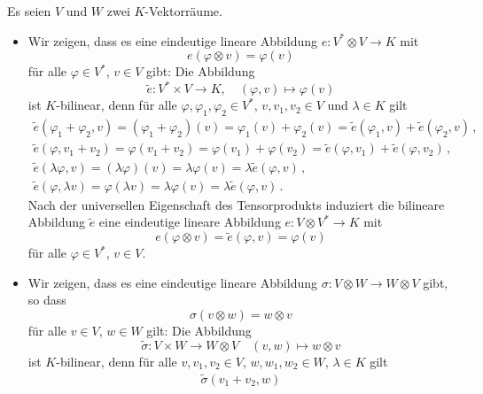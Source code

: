 \begin{example}
  Es seien $V$ und $W$ zwei $K$-Vektorräume.
  \begin{itemize}
    \item
      Wir zeigen, dass es eine eindeutige lineare Abbildung $e \colon V^* \otimes V \to K$ mit
      \[
          e(\varphi \otimes v)
        = \varphi(v)
      \]
      für alle $\varphi \in V^*$, $v \in V$ gibt:
      Die Abbildung
      \[
                \tilde{e}
        \colon  V^* \times V
        \to     K,
        \quad   (\varphi, v)
        \mapsto \varphi(v)
      \]
      ist $K$-bilinear, denn für alle $\varphi, \varphi_1, \varphi_2 \in V^*$, $v, v_1, v_2 \in V$ und $\lambda \in K$ gilt
      \begin{gather*}
                \tilde{e}(\varphi_1 + \varphi_2, v)
        = (\varphi_1 + \varphi_2)(v)
        = \varphi_1(v) + \varphi_2(v)
        = \tilde{e}(\varphi_1, v) + \tilde{e}(\varphi_2, v) \,,
        \\
          \tilde{e}(\varphi, v_1 + v_2)
        = \varphi(v_1 + v_2)
        = \varphi(v_1) + \varphi(v_2)
        = \tilde{e}(\varphi, v_1) + \tilde{e}(\varphi, v_2) \,,
        \\
          \tilde{e}(\lambda \varphi, v)
        = (\lambda \varphi)(v)
        = \lambda \varphi(v)
        = \lambda \tilde{e}(\varphi, v) \,,
        \\
          \tilde{e}(\varphi, \lambda v)
        = \varphi(\lambda v)
        = \lambda \varphi(v)
        = \lambda \tilde{e}(\varphi, v) \,.
      \end{gather*}
      Nach der universellen Eigenschaft des Tensorprodukts induziert die bilineare Abbildung $\tilde{e}$ eine eindeutige lineare Abbildung $e \colon V \otimes V^* \to K$ mit
      \[
          e(\varphi \otimes v)
        = \tilde{e}(\varphi, v)
        = \varphi(v)
      \]
      für alle $\varphi \in V^*$, $v \in V$.
    \item
      Wir zeigen, dass es eine eindeutige lineare Abbildung $\sigma \colon V \otimes W \to W \otimes V$ gibt, so dass
      \[
          \sigma(v \otimes w)
        = w \otimes v
      \]
      für alle $v \in V$, $w \in W$ gilt:
      Die Abbildung
      \[
                \tilde{\sigma}
        \colon  V \times W
        \to     W \otimes V
        \quad   (v,w)
        \mapsto w \otimes v
      \]
      ist $K$-bilinear, denn für alle $v, v_1, v_2 \in V$, $w, w_1, w_2 \in W$, $\lambda \in K$ gilt
      \begin{gather*}
          \tilde{\sigma}(v_1 + v_2, w)

\end{gather*}
\end{itemize}
\end{example}
